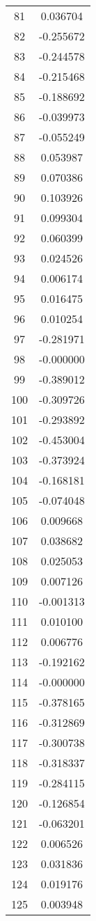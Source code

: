 \documentclass[12pt]{article}
\begin{document}
\begin{longtable}{@{}cc@{}}
81 & 0.036704 \\
82 & -0.255672 \\
83 & -0.244578 \\
84 & -0.215468 \\
85 & -0.188692 \\
86 & -0.039973 \\
87 & -0.055249 \\
88 & 0.053987 \\
89 & 0.070386 \\
90 & 0.103926 \\
91 & 0.099304 \\
92 & 0.060399 \\
93 & 0.024526 \\
94 & 0.006174 \\
95 & 0.016475 \\
96 & 0.010254 \\
97 & -0.281971 \\
98 & -0.000000 \\
99 & -0.389012 \\
100 & -0.309726 \\
101 & -0.293892 \\
102 & -0.453004 \\
103 & -0.373924 \\
104 & -0.168181 \\
105 & -0.074048 \\
106 & 0.009668 \\
107 & 0.038682 \\
108 & 0.025053 \\
109 & 0.007126 \\
110 & -0.001313 \\
111 & 0.010100 \\
112 & 0.006776 \\
113 & -0.192162 \\
114 & -0.000000 \\
115 & -0.378165 \\
116 & -0.312869 \\
117 & -0.300738 \\
118 & -0.318337 \\
119 & -0.284115 \\
120 & -0.126854 \\
121 & -0.063201 \\
122 & 0.006526 \\
123 & 0.031836 \\
124 & 0.019176 \\
125 & 0.003948 \\

\end{longtable}
\end{document}
